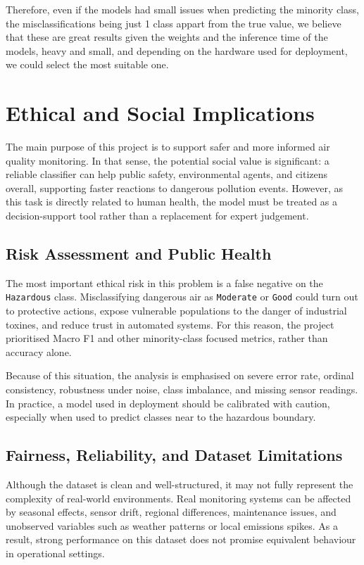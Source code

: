 \documentclass[a4paper,12pt]{article}
\begin{document}
	Therefore, even if the models had small issues when predicting the minority class, the misclassifications being just 1 class appart from the true value, we believe that these are great results given the weights and the inference time of the models, heavy and small, and depending on the hardware used for deployment, we could select the most suitable one.


	\section{Ethical and Social Implications}
	
	The main purpose of this project is to support safer and more informed air quality monitoring. In that sense, the potential social value is significant: a reliable classifier can help public safety, environmental agents, and citizens overall, supporting faster reactions to dangerous pollution events. However, as this task is directly related to human health, the model must be treated as a decision-support tool rather than a replacement for expert judgement.
	
	\subsection{Risk Assessment and Public Health}
	
	The most important ethical risk in this problem is a false negative on the \texttt{Hazardous} class. Misclassifying dangerous air as \texttt{Moderate} or \texttt{Good} could turn out to protective actions, expose vulnerable populations to the danger of industrial toxines, and reduce trust in automated systems. For this reason, the project prioritised Macro F1 and other minority-class focused metrics, rather than accuracy alone.
	
	Because of this situation, the analysis is emphasised on severe error rate, ordinal consistency, robustness under noise, class imbalance, and missing sensor readings. In practice, a model used in deployment should be calibrated with caution, especially when used to predict classes near to the hazardous boundary.
	
	\subsection{Fairness, Reliability, and Dataset Limitations}
	
	Although the dataset is clean and well-structured, it may not fully represent the complexity of real-world environments. Real monitoring systems can be affected by seasonal effects, sensor drift, regional differences, maintenance issues, and unobserved variables such as weather patterns or local emissions spikes. As a result, strong performance on this dataset does not promise equivalent behaviour in operational settings.
	
\end{document}
